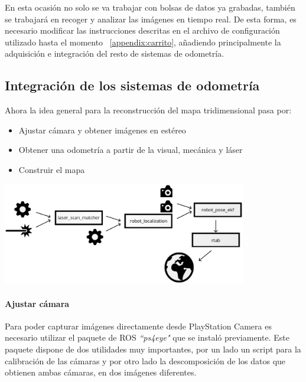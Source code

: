 En esta ocasión no solo se va trabajar con bolsas de datos ya grabadas, también
se trabajará en recoger y analizar las imágenes en tiempo real. De esta forma,
es necesario modificar las instrucciones descritas en el archivo de
configuración utilizado hasta el momento ~\ref{appendix:carrito}, añadiendo principalmente la adquisición e integración del resto de sistemas de odometría.

\subsection{Integración de los sistemas de odometría}

Ahora la idea general para la reconstrucción del mapa tridimensional pasa por:

\begin{itemize}
  \item Ajustar cámara y obtener imágenes en estéreo
  \item Obtener una odometría a partir de la visual, mecánica y láser
  \item Construir el mapa
\end{itemize}

\begin{minipage}{\linewidth}
    \centering
    \includegraphics[width=0.8\textwidth]{images/cap4/Esquema-Ros-Perenquen.eps}
    \label{fig:Esquema-Ros-Perenquen}
\end{minipage}

\paragraph{Ajustar cámara} \hspace{0pt}

Para poder capturar imágenes directamente desde PlayStation Camera es necesario
utilizar el paquete de ROS \textit{``ps4eye"} que se instaló previamente. Este
paquete dispone de dos utilidades muy importantes, por un lado un script para la
calibración de las cámaras y por otro lado la descomposición de los datos que
obtienen ambas cámaras, en dos imágenes diferentes.

